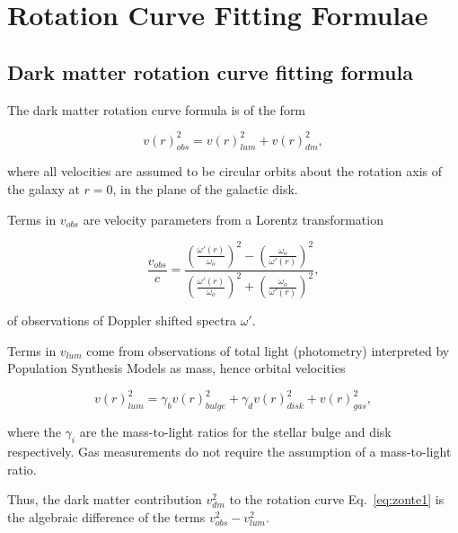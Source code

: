 \documentclass[reprint,%
 amsmath,amssymb,
 aps,
]{revtex4-1}
\begin{document}
\section{Rotation Curve Fitting Formulae  \label{sec:dos}}
 \subsection{Dark matter rotation curve fitting formula}
 
  

 The   dark matter rotation curve formula   is of the form

 \begin{equation}
v(r)^2_{obs}  =  v(r)^2_{lum}  +  v(r)^2_{dm},   
\label{eq:zonte1}
\end{equation} 

  where all velocities are assumed to be circular orbits about the rotation axis of the galaxy at  $r=0$, in the plane of the galactic disk. 
  
  Terms in  $v_{obs}$ are velocity parameters   from a Lorentz transformation 
   

 \begin{equation}
 \frac{v_{obs} }{c}=
\frac{  \left( \frac{\omega'(r)}{\omega_o}\right)^2 -  \left( \frac{\omega_o}{\omega'(r)} \right)^2 }{  \left( \frac{\omega'(r)}{\omega_o}\right)^2  +  \left( \frac{\omega_o}{\omega'(r)}\right)^2 },
\label{eq:modelLumA}
\end{equation} 

  
  of observations of Doppler shifted spectra $\omega'$. 
  
  
  
  Terms in  $v_{lum}$ come from observations of total light  (photometry) interpreted by Population Synthesis Models as mass,   hence orbital velocities  
  
   \begin{equation}
v(r)_{lum}^2 = \gamma_b v(r)_{bulge}^2 +  \gamma_d v(r)_{disk}^2 + v(r)_{gas}^2,   
\label{eq:zonte3}
\end{equation} 
  
 where the $\gamma_i$ are the mass-to-light ratios for the stellar bulge and disk respectively. Gas measurements do not require the assumption of a mass-to-light ratio.  
  
 Thus,    the dark matter contribution $v^2_{dm}$ to the rotation curve Eq.~\ref{eq:zonte1} is the algebraic difference of the   terms  $v^2_{obs}-v^2_{lum}$. 
 
 
 
\end{document}
